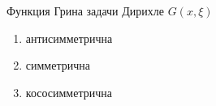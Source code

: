 Функция Грина задачи Дирихле \(G(x,\xi )\)

\begin{enumerate}[label=\arabic*)]
    \item антисимметрична
    \item симметрична
    \item кососимметрична
\end{enumerate}

